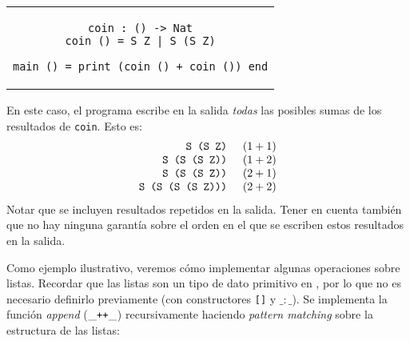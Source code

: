 \begin{center}
\begin{tabular}{c}
\begin{lstlisting}[mathescape=true]
coin : () -> Nat
coin () = S Z | S (S Z)

main () = print (coin () + coin ()) end
\end{lstlisting}
\end{tabular}
\end{center}
En este caso, el programa escribe en la salida
{\em todas} las posibles sumas de los resultados de \verb|coin|.
Esto es:
\[
\begin{array}{r@{\HS}l}
\verb|S (S Z)|         & (1 + 1) \\
\verb|S (S (S Z))|     & (1 + 2) \\
\verb|S (S (S Z))|     & (2 + 1) \\
\verb|S (S (S (S Z)))| & (2 + 2) \\
\end{array}
\]
Notar que se incluyen resultados repetidos en la salida.
Tener en cuenta también que no hay ninguna garantía sobre el orden
en el que se escriben estos resultados en la salida.
\medskip

Como ejemplo ilustrativo, veremos cómo implementar algunas operaciones sobre listas.
Recordar que las listas son un tipo de dato primitivo en \nuflo, por lo que no es necesario
definirlo previamente (con constructores \verb|[]| y $\_:\_$).
Se implementa la función {\em append} ($\_\verb|++|\_$)
recursivamente haciendo {\em pattern matching} sobre la estructura de las listas:

